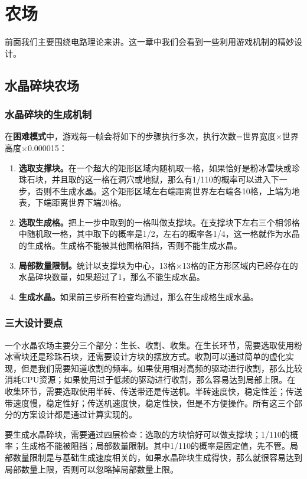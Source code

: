 \chapter{农场}

前面我们主要围绕电路理论来讲。这一章中我们会看到一些利用游戏机制的精妙设计。

\section{水晶碎块农场}
\subsection{水晶碎块的生成机制}
在\textbf{困难模式}中，游戏每一帧会将如下的步骤执行多次，执行次数=世界宽度$\times$世界高度$\times$0.000015：
\begin{enumerate}
    \item \textbf{选取支撑块。}在一个超大的矩形区域内随机取一格，如果恰好是粉冰雪块或珍珠石块，并且取的这一格在洞穴或地狱，那么有1/110的概率可以进入下一步，否则不生成水晶。这个矩形区域左右端距离世界左右端各10格，上端为地表，下端距离世界下端20格。
    \item \textbf{选取生成格。}把上一步中取到的一格叫做支撑块。在支撑块下左右三个相邻格中随机取一格，其中取下的概率是1/2，左右的概率各1/4，这一格就作为水晶的生成格。生成格不能被其他图格阻挡，否则不能生成水晶。
    \item \textbf{局部数量限制。}统计以支撑块为中心，13格$\times$13格的正方形区域内已经存在的水晶碎块数量，如果超过了1，那么不能生成水晶。
    \item \textbf{生成水晶。}如果前三步所有检查均通过，那么在生成格生成水晶。
\end{enumerate}

\subsection{三大设计要点}
一个水晶农场主要分三个部分：生长、收割、收集。在生长环节，需要选取使用粉冰雪块还是珍珠石块，还需要设计方块的摆放方式。收割可以通过简单的虚化实现，但是我们需要知道收割的频率。如果使用相对高频的驱动进行收割，那么比较消耗CPU资源；如果使用过于低频的驱动进行收割，那么容易达到局部上限。在收集环节，需要选取使用半砖、传送带还是传送机。半砖速度快，稳定性差；传送带速度慢，稳定性好；传送机速度快，稳定性快，但是不方便操作。所有这三个部分的方案设计都是通过计算实现的。

要生成水晶碎块，需要通过四层检查：选取的方块恰好可以做支撑块；1/110的概率；生成格不能被阻挡；局部数量限制。其中1/110的概率是固定值，先不管。局部数量限制是与基础生成速度相关的，如果水晶碎块生成得快，那么就很容易达到局部数量上限，否则可以忽略掉局部数量上限。

